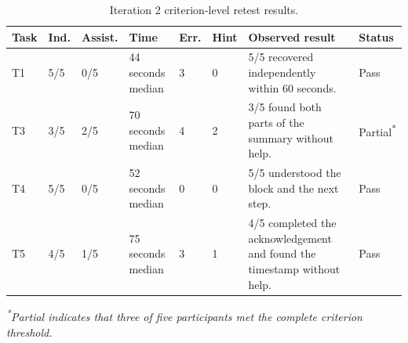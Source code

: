 \documentclass[11pt,a4paper]{article}
\begin{document}
\begin{table}[H]
    \centering
    \footnotesize
    \caption{Iteration 2 criterion-level retest results.}
    \label{tabiterationtworetestresults}
    \begin{tabularx}{\textwidth}
        {@{}L{0.65cm}L{1.35cm}L{1.15cm}L{1.55cm}L{0.65cm}L{0.65cm}YL{1.25cm}@{}}
        \toprule
        Task &
        Ind. &
        Assist. &
        Time &
        Err. &
        Hint &
        Observed result &
        Status\\
        \midrule

        T1 &
        5/5 &
        0/5 &
        44 seconds median &
        3 &
        0 &
        5/5 recovered independently within 60 seconds. &
        Pass\\

        T3 &
        3/5 &
        2/5 &
        70 seconds median &
        4 &
        2 &
        3/5 found both parts of the summary without help. &
        Partial\textsuperscript{*}\\

        T4 &
        5/5 &
        0/5 &
        52 seconds median &
        0 &
        0 &
        5/5 understood the block and the next step. &
        Pass\\

        T5 &
        4/5 &
        1/5 &
        75 seconds median &
        3 &
        1 &
        4/5 completed the acknowledgement and found the timestamp without
        help. &
        Pass\\

        \bottomrule
    \end{tabularx}

    \vspace{0.3em}
    \begin{minipage}{\textwidth}
        \footnotesize
        \textit{\textsuperscript{*}Partial indicates that three of five
        participants met the complete criterion threshold.}
    \end{minipage}
\end{table}
\end{document}
